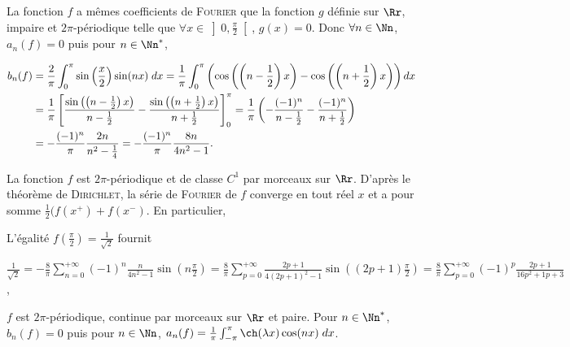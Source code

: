 {{La fonction $f$ a mêmes coefficients de \textsc{Fourier} que la fonction $g$ définie sur $\Rr$, impaire et $2\pi$-périodique telle que $\forall x\in\left]0,\frac{\pi}{2}\right[$, $g(x)=0$. Donc $\forall n\in\Nn$, $a_n(f)=0$ puis pour $n\in\Nn^*$,

\begin{align*}\ensuremath
b_n(f)&=\frac{2}{\pi}\int_{0}^{\pi}\sin\left(\frac{x}{2}\right)\sin(nx)\;dx=\frac{1}{\pi}\int_{0}^{\pi}\left(\cos\left(\left(n-\frac{1}{2}\right)x\right)-\cos\left(\left(n+\frac{1}{2}\right)x\right)\right)dx\\
 &=\frac{1}{\pi}\left[\frac{\sin\left(\left(n-\frac{1}{2}\right)x\right)}{n-\frac{1}{2}}-\frac{\sin\left(\left(n+\frac{1}{2}\right)x\right)}{n+\frac{1}{2}}\right]_0^\pi=\frac{1}{\pi}\left(-\frac{(-1)^n}{n-\frac{1}{2}}-\frac{(-1)^n}{n+\frac{1}{2}}\right)\\
 &=-\frac{(-1)^n}{\pi}\frac{2n}{n^2-\frac{1}{4}}=-\frac{(-1)^n}{\pi}\frac{8n}{4n^2-1}.
\end{align*}

La fonction $f$ est $2\pi$-périodique et de classe $C^1$ par morceaux sur $\Rr$. D'après le théorème de \textsc{Dirichlet}, la série de \textsc{Fourier} de $f$ converge en tout réel $x$ et a pour somme $\frac{1}{2}(f(x^+)+f(x^-)$. En particulier,

\begin{center}
\shadowbox{
$\forall x\in]-\pi,\pi[$, $\sin\left(\frac{x}{2}\right)=-\frac{8}{\pi}\sum_{n=1}^{+\infty}(-1)^n\frac{n}{4n^2-1}\sin(nx)$.
}
\end{center}

L'égalité $f\left(\frac{\pi}{2}\right)=\frac{1}{\sqrt{2}}$ fournit 

\begin{center}
$\frac{1}{\sqrt{2}}=-\frac{8}{\pi}\sum_{n=0}^{+\infty}(-1)^n\frac{n}{4n^2-1}\sin\left(n\frac{\pi}{2}\right)=\frac{8}{\pi}\sum_{p=0}^{+\infty}\frac{2p+1}{4(2p+1)^2-1}\sin\left((2p+1)\frac{\pi}{2}\right)=\frac{8}{\pi}\sum_{p=0}^{+\infty}(-1)^p\frac{2p+1}{16p^2+1p+3}$,
\end{center}

\begin{center}
\end{center}
$f$ est $2\pi$-périodique, continue par morceaux sur $\Rr$ et paire. Pour $n\in\Nn^*$, $b_n(f)=0$ puis pour $n\in\Nn$, $a_n(f)=\frac{1}{\pi}\int_{-\pi}^{\pi}\ch(\lambda x)\cos(nx)\;dx$.

}}
